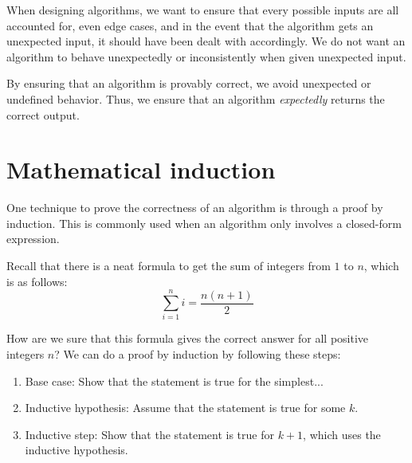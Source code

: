 When designing algorithms, we want to ensure that every possible inputs are all accounted for, even edge cases, and in the event that the algorithm gets an unexpected input, it should have been dealt with accordingly. We do not want an algorithm to behave unexpectedly or inconsistently when given unexpected input.

By ensuring that an algorithm is provably correct, we avoid unexpected or undefined behavior. Thus, we ensure that an algorithm \textit{expectedly} returns the correct output.

\section{Mathematical induction}
One technique to prove the correctness of an algorithm is through a proof by induction. This is commonly used when an algorithm only involves a closed-form expression.

Recall that there is a neat formula to get the sum of integers from $1$ to $n$, which is as follows:
\[
\sum_{i=1}^{n} i = \frac{n\left(n+1\right)}{2}
\]

How are we sure that this formula gives the correct answer for all positive integers $n$? We can do a proof by induction by following these steps:
\begin{enumerate}
    \item Base case: Show that the statement is true for the simplest...
    \item Inductive hypothesis: Assume that the statement is true for some $k$.
    \item Inductive step: Show that the statement is true for $k+1$, which uses the inductive hypothesis.
\end{enumerate}

